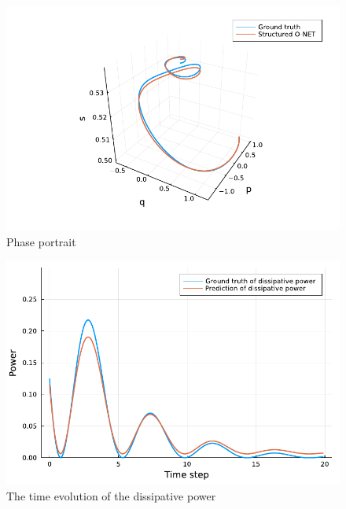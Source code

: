 \documentclass[
	parskip, 			   %
	twoside, 			   %
	DIV=14, 			   %
	BCOR=15.0mm, 		   %
	headsepline, 		   %
	open=right, 		   %
	captions=tableheading, %
	bibliography=totoc,    %
	numbers=noenddot       %
]{scrreprt}
\begin{document}
\begin{figure}[h!]
    \centering
    \includegraphics[scale=1]{figures/idho_phase_portrait.pdf}
    \caption{Phase portrait}
    \label{fig:idho_phase_portrait}
\end{figure}

\clearpage
\begin{figure}[h!]
    \centering
    \includegraphics[scale=1]{figures/idho_dissipative_power.pdf}
    \caption{The time evolution of the dissipative power}
    \label{fig:idho_dissipative_power}
\end{figure}
\end{document}
